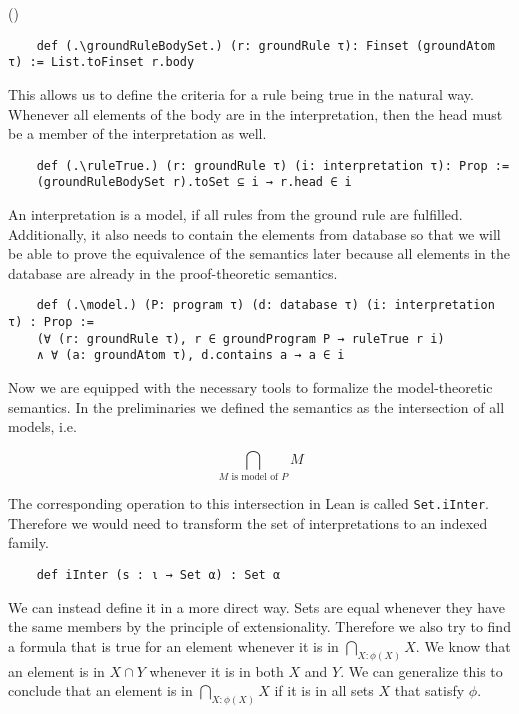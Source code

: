 (\groundRuleBodySetiffgroundRuleBody)


\begin{lstlisting}
    def (.\groundRuleBodySet.) (r: groundRule τ): Finset (groundAtom τ) := List.toFinset r.body
\end{lstlisting}

This allows us to define the criteria for a rule being true in the natural way. Whenever all elements of the body are in the interpretation, then the head must be a member of the interpretation as well.

\begin{lstlisting}
    def (.\ruleTrue.) (r: groundRule τ) (i: interpretation τ): Prop := 
    (groundRuleBodySet r).toSet ⊆ i → r.head ∈ i
\end{lstlisting}

An interpretation is a model, if all rules from the ground rule are fulfilled. Additionally, it also needs to contain the elements from database so that we will be able to prove the equivalence of the semantics later because all elements in the database are already in the proof-theoretic semantics.

\begin{lstlisting}
    def (.\model.) (P: program τ) (d: database τ) (i: interpretation τ) : Prop := 
    (∀ (r: groundRule τ), r ∈ groundProgram P → ruleTrue r i) 
    ∧ ∀ (a: groundAtom τ), d.contains a → a ∈ i
\end{lstlisting}

Now we are equipped with the necessary tools to formalize the model-theoretic semantics. In the preliminaries we defined the semantics as the intersection of all models, i.e.

\[\bigcap_{\text{$M$ is model of $P$}} M\] 

The corresponding operation to this intersection in Lean is called \lstinline|Set.iInter|. Therefore we would need to transform the set of interpretations to an indexed family.

\begin{lstlisting}
    def iInter (s : ι → Set α) : Set α
\end{lstlisting}

We can instead define it in a more direct way. Sets are equal whenever they have the same members by the principle of extensionality. Therefore we also try to find a formula that is true for an element whenever it is in $\bigcap_{X: \phi(X) } X $. We know that an element is in $X \cap Y$ whenever it is in both $X$ and $Y$. We can generalize this to conclude that an element is in $\bigcap_{X: \phi(X) } X $ if it is in all sets $X$ that satisfy $\phi$.

